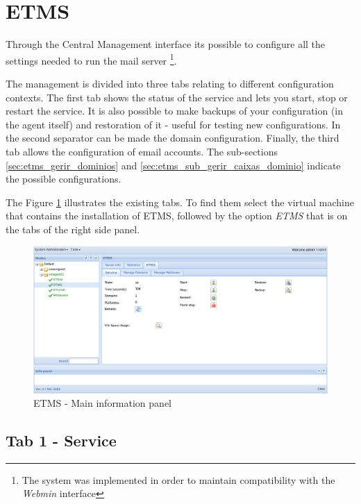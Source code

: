 \section{ETMS}
Through the Central Management interface its possible to configure all the settings needed to run the mail server \footnote{The system was implemented in order to maintain compatibility with the \textit{Webmin} interface}.

The management is divided into three tabs relating to different configuration contexts. The first tab shows the status of the service and lets you start, stop or restart the service. It is also possible to make backups of your configuration (in the agent itself) and restoration of it - useful for testing new configurations. In the second separator can be made the domain configuration. Finally, the third tab allows the configuration of email accounts. The sub-sections \ref{sec:etms_gerir_dominios} and \ref{sec:etms_sub_gerir_caixas_dominio} indicate the possible configurations.

The Figure \ref{fig:etms_main_info} illustrates the existing tabs. To find them select the virtual machine that contains the installation of ETMS, followed by the option \textit{ETMS} that is on the tabs of the right side panel.

\begin{figure}[H]
    \begin{center}
    \includegraphics[scale=0.45]{screenshots/etms/etms_main_info.png}
    \caption{ETMS - Main information panel}
    \label{fig:etms_main_info}
    \end{center}
\end{figure}


\subsection{Tab 1 - Service}
\label{sec:etms_info_principal}

